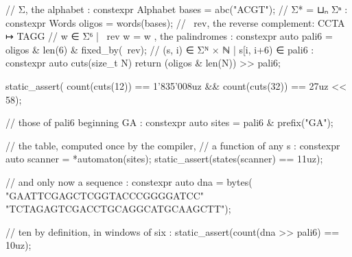 \begin{listing}[htbp]
\begin{minipage}[t]{0.49\linewidth}
\begin{cpp}
// Σ, the alphabet :
constexpr Alphabet bases = abc("ACGT");
// Σ* = ⊔ₙ Σⁿ :
constexpr Words oligos = words(bases);
// ~rev, the reverse complement: CCTA ↦ TAGG
// { w ∈ Σ⁶ | ~rev w = w }, the palindromes :
constexpr auto pali6 =
  oligos & len(6) & fixed_by(~rev);
// { (s, i) ∈ Σᴺ × ℕ | s[i, i+6) ∈ pali6 } :
constexpr auto cuts(size_t N) {
  return (oligos & len(N)) >> pali6;
}

static_assert(
  count(cuts(12)) == 1'835'008uz &&
  count(cuts(32)) == 27uz << 58);
\end{cpp}
\end{minipage}\hfill
\begin{minipage}[t]{0.49\linewidth}
\begin{cpp}
// those of pali6 beginning GA :
constexpr auto sites =
  pali6 & prefix("GA");

// the table, computed once by the compiler,
// a function of any s :
constexpr auto scanner =
  *automaton(sites);
static_assert(states(scanner) == 11uz);

// and only now a sequence :
constexpr auto dna = bytes(
  "GAATTCGAGCTCGGTACCCGGGGATCC"
  "TCTAGAGTCGACCTGCAGGCATGCAAGCTT");

// ten by definition, in windows of six :
static_assert(count(dna >> pali6) == 10uz);


\end{cpp}
\end{minipage}
\end{listing}
